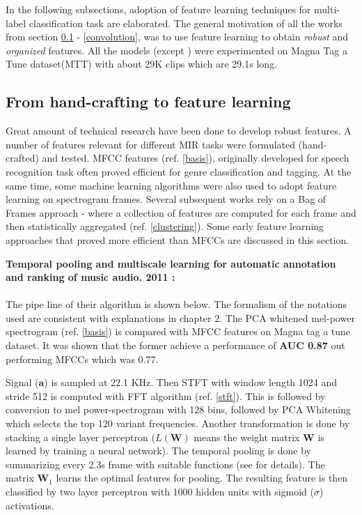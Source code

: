 \noindent In the following subsections, adoption of feature learning techniques for multi-label classification task are elaborated. The general motivation of all the works from section \ref{featurelearning} - \ref{convolution}, was to use feature learning to obtain \textit{robust} and \textit{organized} features.  All the models (except \cite{MusicMotive}) were experimented on Magna Tag a Tune dataset(MTT)\cite{MTT} with about 29K clips which are 29.1s long.

\subsection{From hand-crafting to feature learning}
\label{featurelearning}
Great amount of technical research have been done to develop robust features. A number of features relevant for different MIR tasks were formulated (hand-crafted) and tested. MFCC features (ref. \ref{basis}), originally developed for speech recognition task often proved efficient for genre classification and tagging. At the same time, some machine learning algorithms were also used to adopt feature learning on spectrogram frames. Several subsequent works rely on a Bag of Frames approach - where a collection of features are computed for each frame and then statistically aggregated (ref. \ref{clustering}). Some early feature learning approaches that proved more efficient than MFCCs are discussed in this section.
\bigskip

\noindent \textbf{Temporal pooling and multiscale learning for automatic annotation and ranking of music audio. 2011 \cite{featurelearn1}:}\\
\\
\noindent The pipe line of their algorithm is shown below. The formalism of the notations used are consistent with explanations in chapter 2. The PCA whitened mel-power spectrogram (ref. \ref{basis}) is compared with MFCC features on Magna tag a tune dataset. It was shown that the former achieve a performance of \textbf{AUC 0.87} out performing MFCCs which was 0.77.  
\bigskip

\noindent Signal ($\textbf{a}$) is sampled at 22.1 KHz. Then STFT with window length 1024 and stride 512 is computed with FFT algorithm (ref. \ref{stft}). This is followed by conversion to mel power-spectrogram with 128 bins, followed by PCA Whitening which selects the top 120 variant frequencies. Another transformation is done by stacking a single layer perceptron ($L(\textbf{W})$ means the weight matrix $\textbf{W}$ is learned by training a neural network). The temporal pooling is done by summarizing every 2.3s frame with suitable functions (see \cite{featurelearn1} for details). The matrix $\textbf{W}_{1}$ learns the optimal features for pooling. The resulting feature is then classified by two layer perceptron with 1000 hidden units with sigmoid ($\sigma$) activations.

